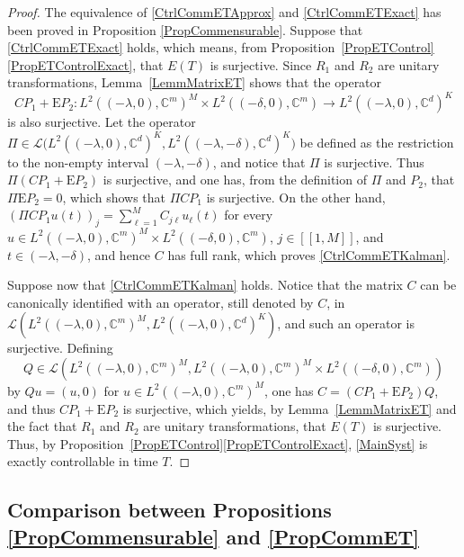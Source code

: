 \documentclass[JEP,XML,SOM,Unicode]{cedram}
\newcommand{\llbracket}{[\![}
\newcommand{\rrbracket}{]\!]}
\theoremstyle{plain}
\theoremstyle{definition}
\newcommand{\Epsilon}{\mathrm E}
\begin{document}
\begin{proof}
The equivalence of \eqref{CtrlCommETApprox} and \eqref{CtrlCommETExact} has been proved in Proposition \ref{PropCommensurable}. Suppose that \eqref{CtrlCommETExact} holds, which means, from Proposition~\ref{PropETControl}\eqref{PropETControlExact}, that $E(T)$ is surjective. Since $R_1$ and $R_2$ are unitary transformations, Lemma~\ref{LemmMatrixET} shows that the operator
\[
C P_1 + \Epsilon P_2: L^2((-\lambda, 0), \mathbb C^m)^M \times L^2((-\delta, 0), \mathbb C^m) \to L^2((-\lambda, 0), \mathbb C^d)^K
\]
is also surjective. Let the operator $\Pi \in \mathcal L\bigl(L^2((-\lambda, 0), \mathbb C^d)^K, L^2((-\lambda, -\delta), \mathbb C^d)^K\bigr)$ be defined as the restriction to the non-empty interval $(-\lambda, -\delta)$, and notice that $\Pi$ is surjective. Thus $\Pi(C P_1 + \Epsilon P_2)$ is surjective, and one has, from the definition of $\Pi$ and $P_2$, that $\Pi \Epsilon P_2 = 0$, which shows that $\Pi C P_1$ is surjective. On the other hand, $(\Pi C P_1 u(t))_j = \sum_{\ell=1}^M C_{j\ell} u_\ell(t)$ for every $u \in L^2((-\lambda, 0), \mathbb C^m)^M \times L^2((-\delta, 0), \mathbb C^m)$, $j \in \llbracket 1, M\rrbracket$, and $t \in (-\lambda, -\delta)$, and hence $C$ has full rank, which proves \eqref{CtrlCommETKalman}.

Suppose now that \eqref{CtrlCommETKalman} holds. Notice that the matrix $C$ can be canonically identified with an operator, still denoted by $C$, in $\mathcal L\left(L^2((-\lambda, 0), \mathbb C^m)^M, L^2((-\lambda, 0), \mathbb C^d)^K\right)$, and such an operator is surjective. Defining
\[
Q \in \mathcal L(L^2((-\lambda, 0), \mathbb C^m)^M, L^2((-\lambda, 0), \mathbb C^m)^M \times L^2((-\delta, 0), \mathbb C^m))
\]
by $Q u = (u, 0)$ for $u \in L^2((-\lambda, 0), \mathbb C^m)^M$, one has $C = (C P_1 + \Epsilon P_2) Q$, and thus $C P_1 + \Epsilon P_2$ is surjective, which yields, by Lemma~\ref{LemmMatrixET} and the fact that $R_1$ and $R_2$ are unitary transformations, that $E(T)$ is surjective. Thus, by Proposition~\ref{PropETControl}\eqref{PropETControlExact}, \eqref{MainSyst} is exactly controllable in time $T$.
\end{proof}

\subsection{Comparison between Propositions \ref{PropCommensurable} and \ref{PropCommET}}
\end{document}
